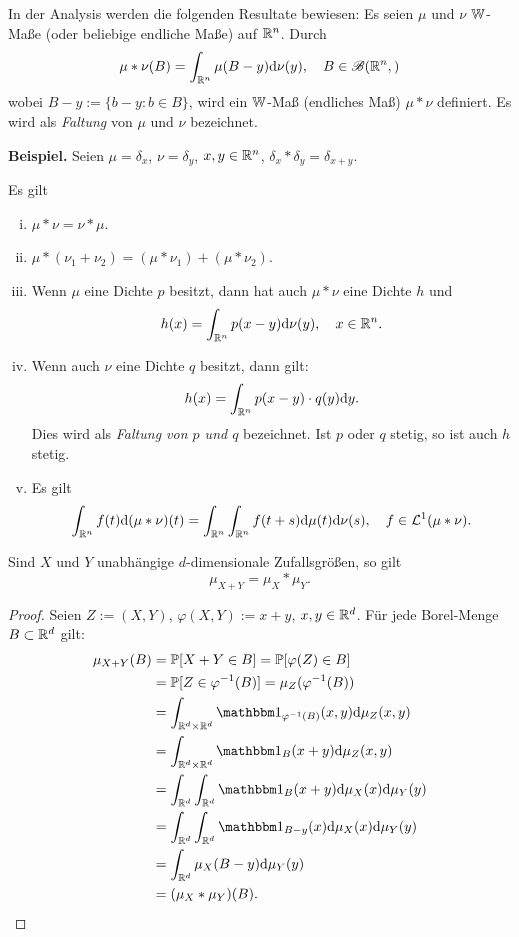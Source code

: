 \begin{rmrk}
  In der Analysis werden die folgenden Resultate bewiesen: Es seien $\mu$ und
  $\nu$ $\mathbb{W}$-Maße (oder beliebige endliche Maße) auf $\mathbb{R}^n$. Durch
  \[ \mu \ast \nu(B) = \int_{\mathbb{R}^n} \mu( B-y ) \mathrm{d} \nu(y), \quad B \in
    \mathscr{B}(\mathbb{R}^n,) \]
  wobei $B-y := \{ b-y : b \in B \}$, wird ein $\mathbb{W}$-Maß (endliches Maß) $\mu
  \ast \nu$ definiert. Es wird als \emph{Faltung} von $\mu$ und $\nu$
  bezeichnet.

  \textbf{Beispiel.} Seien $\mu = \delta_x$, $\nu = \delta_y$, $x,y \in \mathbb{R}^n$, $\delta_x \ast
  \delta_y = \delta_{x+y}$.

  Es gilt
  \begin{enumerate}[(i)]
  \item $\mu \ast \nu = \nu \ast \mu$.
  \item $\mu \ast (\nu_1 + \nu_2) = (\mu \ast \nu_1) + (\mu \ast \nu_2)$.
  \item Wenn $\mu$ eine Dichte $p$ besitzt, dann hat auch $\mu \ast \nu$ eine
    Dichte $h$ und
    \[ h(x) = \int_{\mathbb{R}^n} p(x-y) \mathrm{d} \nu(y), \quad x \in \mathbb{R}^n. \]
  \item Wenn auch $\nu$ eine Dichte $q$ besitzt, dann gilt:
    \[ h(x) = \int_{\mathbb{R}^n} p(x-y) \cdot q(y) \mathrm{d} y. \]
    Dies wird als \emph{Faltung von $p$ und $q$} bezeichnet. Ist $p$ oder $q$
    stetig, so ist auch $h$ stetig.
  \item Es gilt
    \[ \int_{\mathbb{R}^n} f(t) \mathrm{d} (\mu \ast \nu)(t) = \int_{\mathbb{R}^n}
      \int_{\mathbb{R}^n} f(t+s) \mathrm{d} \mu(t) \mathrm{d} \nu(s), \quad f \in
      \mathcal{L}^1(\mu \ast \nu). \]
  \end{enumerate}
\end{rmrk}

\begin{thm}
  Sind $X$ und $Y$ unabhängige $d$-dimensionale Zufallsgrößen, so gilt
  \[ \mu_{X + Y} = \mu_X \ast \mu_Y. \]
\end{thm}

\begin{proof}
  Seien $Z := (X,Y)$, $\varphi(X,Y) := x+y$, $x,y \in \mathbb{R}^d$. Für jede
  Borel-Menge $B \subset \mathbb{R}^d$ gilt:
  \begin{align*}
    \mu_{X+Y}(B)
    &= \pP[X+Y \in B] = \pP[\varphi(Z) \in B]  \\
    &= \pP[ Z \in \varphi^{-1}(B) ] = \mu_Z( \varphi^{-1}(B) ) \\
    &= \int_{\real^d \times \real^d} \ind_{\varphi^{-1}(B)}(x,y) \diffop \mu_Z(x,y) \\
    &= \int_{\real^d \times \real^d} \ind_{B}(x+y) \diffop \mu_Z(x,y) \\
    &= \int_{\real^d} \int_{\real^d} \ind_{B}(x+y) \diffop \mu_X(x) \diffop \mu_Y(y) \\
    &= \int_{\real^d} \int_{\real^d} \ind_{B - y}(x) \diffop \mu_X(x) \diffop \mu_Y(y) \\
    &= \int_{\real^d} \mu_X(B - y) \diffop \mu_Y(y) \\
    &= (\mu_X \ast \mu_Y)(B). \qedhere
  \end{align*}
\end{proof}

